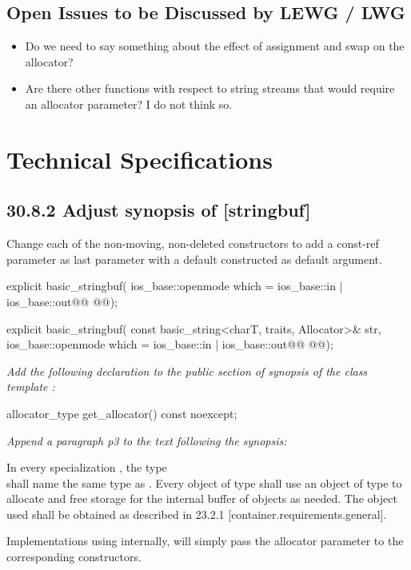 \documentclass[ebook,11pt,article]{memoir}
\begin{document}
\section{Open Issues to be Discussed by LEWG / LWG}
\begin{itemize}
\item Do we need to say something about the effect of assignment and swap on the allocator?
\item Are there other functions with respect to string streams that would require an allocator parameter? I do not think so.
\end{itemize}

\chapter{Technical Specifications}

\section{30.8.2 Adjust synopsis of  [stringbuf]}
Change each of the non-moving, non-deleted constructors to add a const-ref  parameter as last parameter with a default constructed  as default argument. 
\begin{codeblock}
explicit basic_stringbuf(
        ios_base::openmode which = ios_base::in | ios_base::out@\added{,}@
        @@);

explicit basic_stringbuf(
        const basic_string<charT, traits, Allocator>& str,
        ios_base::openmode which = ios_base::in | ios_base::out@\added{,}@
        @@);
\end{codeblock}

\textit{Add the following declaration to the public section of synopsis of the class template :}
\begin{addedblock}
\begin{codeblock}
    allocator_type get_allocator() const noexcept;
\end{codeblock}
\end{addedblock}

\textit{Append a paragraph p3 to the text following the synopsis:}

\begin{insrt}
\pnum
In every specialization , the type \\ shall name the same type as . Every object of type  shall use an object of type  to allocate and free storage for the internal buffer of  objects as needed. The  object used shall be obtained as described in 23.2.1 [container.requirements.general].
\begin{note}
Implementations using  internally, will simply pass the allocator parameter to the corresponding  constructors.
\end{note}
\end{insrt}
\end{document}
